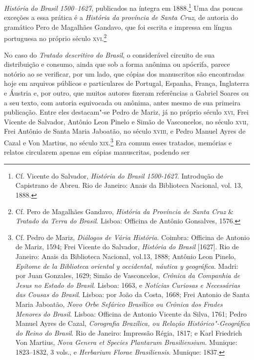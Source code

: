 \textit{História do Brasil 1500--1627}, publicados na íntegra em 1888.\footnote{ Cf. Vicente do Salvador, \textit{História do Brasil 1500-1627}.
Introdução de Capistrano de Abreu. Rio de Janeiro: Anais da Biblioteca Nacional, vol. 13, 1888.}
Uma das poucas exceções a essa prática é a \textit{História da
província de Santa Cruz}, de autoria do gramático Pero de
Magalhães Gandavo, que foi escrita e impressa em língua portuguesa no
próprio século \textsc{xvi}.\footnote{ Cf. Pero de Magalhães Gandavo,
\textit{História da Província de Santa Cruz} \& \textit{Tratado da
Terra do Brasil}. Lisboa: Officina de Antônio Gonsalves, 1576.}

No caso do \textit{Tratado descritivo do Brasil}, o considerável
circuito de sua distribuição e consumo, ainda que sob a forma anônima
ou apócrifa, parece notório ao se verificar, por um lado, que cópias
dos manuscritos são encontradas hoje em arquivos públicos e
particulares de Portugal, Espanha, França, Inglaterra e Áustria e, por
outro, que muitos autores fizeram referências a Gabriel Soares ou a seu
texto, com autoria equivocada ou anônima, antes mesmo de sua primeira
publicação. Entre eles destacam"-se Pedro de Mariz, já no próprio século
\textsc{xvi}, Frei Vicente de Salvador, Antônio Leon Pinelo e Simão de
Vasconcelos, no século \textsc{xvii}, Frei Antônio de Santa Maria Jaboatão, no
século \textsc{xviii}, e Pedro Manuel Ayres de Cazal e Von Martius, no século
\textsc{xix}.\footnote{ Cf. Pedro de Mariz, \textit{Diálogos de Vária História}.
Coimbra: Officina de Antonio de Mariz, 1594; Frei Vicente do
Salvador,\textit{ História do Brasil} [1627]. Rio de Janeiro: Anais da
Biblioteca Nacional, vol.13, 1888; Antônio Leon Pinelo, \textit{Epítome
de la Biblioteca oriental y occidental, náutica y geográfica}. Madri:
por Juan Gonzales, 1629;  Simão de Vasconcelos, \textit{Crônica
da Companhia de Jesus no Estado do Brasil}. Lisboa: 1663, e
\textit{Notícias Curiosas e Necessárias das Cousas do Brasil}. Lisboa:
por João da Costa, 1668; Frei Antonio de Santa Maria Jaboatão,
\textit{Novo Orbe Sefárico Brasílico ou Crônica dos Frades Menores do
Brasil}. Lisboa: Officina de Antonio Vicente da Silva, 1761; 
Pedro Manuel Ayres de Cazal, \textit{Corografia Brazílica, ou Relação
Histórico"-Geográfica do Reino do Brasil}. Rio de Janeiro: Impressão
Régia, 1817; e Karl Friedrich Von Martius,
\textit{Nova Genera et Species Plantarum
Brasiliensium}. Munique: 1823--1832, 3 vols., e \textit{Herbarium
Florae Brasiliensis}. Munique: 1837.} Era comum esses tratados,
memórias e relatos circularem apenas em cópias manuscritas, podendo ser
